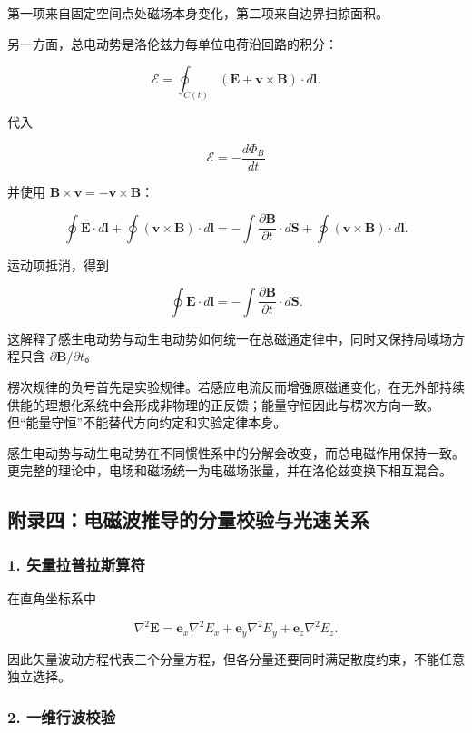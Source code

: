 第一项来自固定空间点处磁场本身变化，第二项来自边界扫掠面积。

另一方面，总电动势是洛伦兹力每单位电荷沿回路的积分：

\[
\mathcal E
=\oint_{C(t)}
(\mathbf E+\mathbf v\times\mathbf B)
\cdot d\mathbf l.
\]

代入

\[
\mathcal E=-\frac{d\Phi_B}{dt}
\]

并使用 \(\mathbf B\times\mathbf v=-\mathbf v\times\mathbf B\)：

\[
\oint\mathbf E\cdot d\mathbf l
+\oint(\mathbf v\times\mathbf B)\cdot d\mathbf l
=-\int\frac{\partial\mathbf B}{\partial t}\cdot d\mathbf S
+\oint(\mathbf v\times\mathbf B)\cdot d\mathbf l.
\]

运动项抵消，得到

\[
\oint\mathbf E\cdot d\mathbf l
=-\int\frac{\partial\mathbf B}{\partial t}\cdot d\mathbf S.
\]

这解释了感生电动势与动生电动势如何统一在总磁通定律中，同时又保持局域场方程只含
\(\partial\mathbf B/\partial t\)。

楞次规律的负号首先是实验规律。若感应电流反而增强原磁通变化，在无外部持续供能的理想化系统中会形成非物理的正反馈；能量守恒因此与楞次方向一致。但``能量守恒''不能替代方向约定和实验定律本身。

感生电动势与动生电动势在不同惯性系中的分解会改变，而总电磁作用保持一致。更完整的理论中，电场和磁场统一为电磁场张量，并在洛伦兹变换下相互混合。

\subsection{附录四：电磁波推导的分量校验与光速关系}\label{m7:ux9644ux5f55ux56dbux7535ux78c1ux6ce2ux63a8ux5bfcux7684ux5206ux91cfux6821ux9a8cux4e0eux5149ux901fux5173ux7cfb}

\subsubsection{1.
矢量拉普拉斯算符}\label{m7:ux77e2ux91cfux62c9ux666eux62c9ux65afux7b97ux7b26}

在直角坐标系中

\[
\nabla^2\mathbf E
=\mathbf e_x\nabla^2E_x
+\mathbf e_y\nabla^2E_y
+\mathbf e_z\nabla^2E_z.
\]

因此矢量波动方程代表三个分量方程，但各分量还要同时满足散度约束，不能任意独立选择。

\subsubsection{2.
一维行波校验}\label{m7:ux4e00ux7ef4ux884cux6ce2ux6821ux9a8c}

